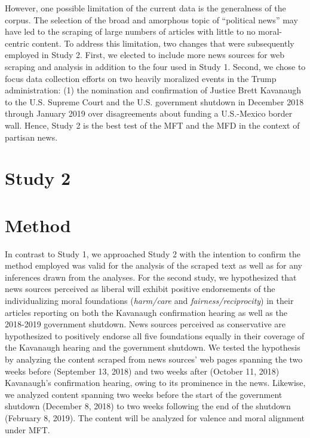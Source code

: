 \documentclass[
  man,floatsintext]{apa6}
\begin{document}
However, one possible limitation of the current data is the generalness of the corpus. The selection of the broad and amorphous topic of ``political news'' may have led to the scraping of large numbers of articles with little to no moral-centric content. To address this limitation, two changes that were subsequently employed in Study 2. First, we elected to include more news sources for web scraping and analysis in addition to the four used in Study 1. Second, we chose to focus data collection efforts on two heavily moralized events in the Trump administration: (1) the nomination and confirmation of Justice Brett Kavanaugh to the U.S. Supreme Court and the U.S. government shutdown in December 2018 through January 2019 over disagreements about funding a U.S.-Mexico border wall. Hence, Study 2 is the best test of the MFT and the MFD in the context of partisan news.

\hypertarget{study-2}{%
\section{Study 2}\label{study-2}}

\hypertarget{method-1}{%
\section{Method}\label{method-1}}

In contrast to Study 1, we approached Study 2 with the intention to confirm the method employed was valid for the analysis of the scraped text as well as for any inferences drawn from the analyses. For the second study, we hypothesized that news sources perceived as liberal will exhibit positive endorsements of the individualizing moral foundations (\emph{harm/care} and \emph{fairness/reciprocity}) in their articles reporting on both the Kavanaugh confirmation hearing as well as the 2018-2019 government shutdown. News sources perceived as conservative are hypothesized to positively endorse all five foundations equally in their coverage of the Kavanaugh hearing and the government shutdown. We tested the hypothesis by analyzing the content scraped from news sources' web pages spanning the two weeks before (September 13, 2018) and two weeks after (October 11, 2018) Kavanaugh's confirmation hearing, owing to its prominence in the news. Likewise, we analyzed content spanning two weeks before the start of the government shutdown (December 8, 2018) to two weeks following the end of the shutdown (February 8, 2019). The content will be analyzed for valence and moral alignment under MFT.
\end{document}
